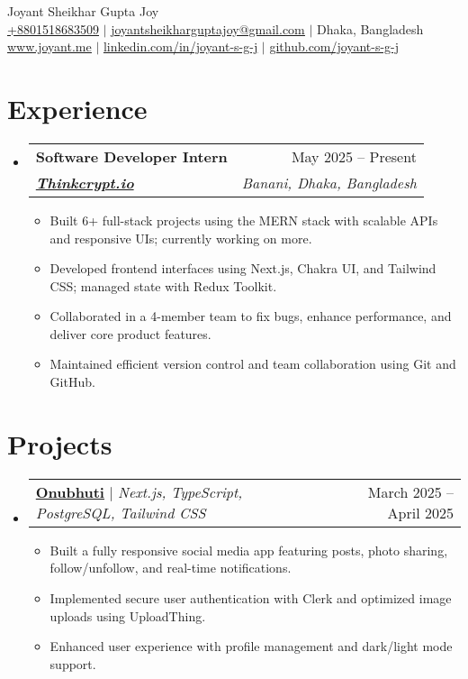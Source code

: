 \documentclass[a4paper,11pt]{article}
\makeatletter
\newcommand{\resumeItem}[1]{
  \item\small{
    {#1 \vspace{-2pt}}
  }
}
\newcommand{\resumeSubheading}[5]{
  \vspace{-2pt}\item
    \begin{tabular*}{0.97\textwidth}[t]{l@{\extracolsep{\fill}}r}
      \textbf{#1} & #2 \\
      \textbf{\textit{\href{#3}{\small #4}}} & \textit{\small #5} \\
    \end{tabular*}\vspace{-7pt}
}
\newcommand{\resumeProjectHeading}[2]{
    \item
    \begin{tabular*}{0.97\textwidth}{l@{\extracolsep{\fill}}r}
      \small#1 & #2 \\
    \end{tabular*}\vspace{-7pt}
}
\newcommand{\resumeSubHeadingListStart}{\begin{itemize}[leftmargin=0.15in, label={}]}
\newcommand{\resumeSubHeadingListEnd}{\end{itemize}}
\newcommand{\resumeItemListStart}{\begin{itemize}}
\newcommand{\resumeItemListEnd}{\end{itemize}\vspace{-5pt}}
\makeatother
\begin{document}
\begin{center}
    {\Huge \rmfamily Joyant Sheikhar Gupta Joy} \\ \vspace{1pt}
    \small \href{tel:+8801518683509}{\underline{+8801518683509}} $|$ 
    \href{mailto:joyantsheikharguptajoy@gmail.com}{\underline{joyantsheikharguptajoy@gmail.com}} $|$ 
    \small{Dhaka, Bangladesh} \\
    \href{https://joyant.me/}{\underline{www.joyant.me}} $|$
    \href{https://www.linkedin.com/in/joyant-s-g-j/}{\underline{linkedin.com/in/joyant-s-g-j}} $|$
    \href{https://github.com/joyant-s-g-j}{\underline{github.com/joyant-s-g-j}}
\end{center}

\section{\textbf{Experience}}
  \resumeSubHeadingListStart
    \resumeSubheading
      {Software Developer Intern}{May 2025 -- Present}
      {https://www.thinkcrypt.dev/}{Thinkcrypt.io}{Banani, Dhaka, Bangladesh }
      \resumeItemListStart
        \resumeItem{Built 6+ full-stack projects using the MERN stack with scalable APIs and responsive UIs; currently working on more.}
        \resumeItem{Developed frontend interfaces using Next.js, Chakra UI, and Tailwind CSS; managed state with Redux Toolkit.}
        \resumeItem{Collaborated in a 4-member team to fix bugs, enhance performance, and deliver core product features.}
        \resumeItem{Maintained efficient version control and team collaboration using Git and GitHub.}
      \resumeItemListEnd
  \resumeSubHeadingListEnd

\section{\textbf{Projects}}
  \resumeSubHeadingListStart
    \resumeProjectHeading
        {\textbf{\href{https://onubhuti.vercel.app/}{Onubhuti}} $|$ \emph{Next.js, TypeScript, PostgreSQL, Tailwind CSS}}{March 2025 -- April 2025}
        \resumeItemListStart
          \resumeItem{Built a fully responsive social media app featuring posts, photo sharing, follow/unfollow, and real-time notifications.}
          \resumeItem{Implemented secure user authentication with Clerk and optimized image uploads using UploadThing.}
          \resumeItem{Enhanced user experience with profile management and dark/light mode support.}
        \resumeItemListEnd
  \resumeSubHeadingListEnd
\end{document}

